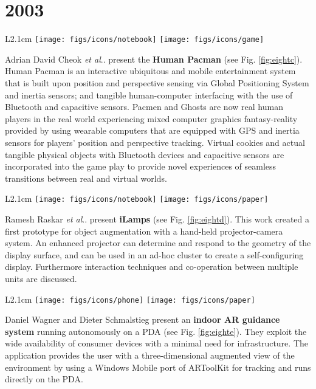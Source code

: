 \documentclass[12pt,a4paper]{article}
\makeatletter
\DeclareRobustCommand\onedot{\futurelet\@let@token\@onedot}
\def\@onedot{\ifx\@let@token.\else.\null\fi\xspace}
\def\etal{\emph{et al}\onedot}
\makeatother
\begin{document}
\vspace{-5pt}
\section*{2003}

\begin{wrapfigure}{L}{2.1cm}
	\vspace{-10pt}	
	\texttt{[image: figs/icons/notebook]}
	\texttt{[image: figs/icons/game]}	
	\vspace{-20pt}		
\end{wrapfigure}
Adrian David Cheok \etal present the \textbf{Human Pacman} \cite{Cheok03} (see Fig. \ref{fig:eightc}). Human Pacman is an interactive ubiquitous and mobile entertainment system that is built upon position and perspective sensing via Global Positioning System and inertia sensors; and tangible human-computer interfacing with the use of Bluetooth and capacitive sensors. Pacmen and Ghosts are now real human players in the real world experiencing mixed computer graphics fantasy-reality provided by using wearable computers that are equipped with GPS and inertia sensors for players' position and perspective tracking. Virtual cookies and actual tangible physical objects with Bluetooth devices and capacitive sensors are incorporated into the game play to provide novel experiences of seamless transitions between real and virtual worlds.

\vspace{0.1in}

\begin{wrapfigure}{L}{2.1cm}
	\vspace{-10pt}	
	\texttt{[image: figs/icons/notebook]}
	\texttt{[image: figs/icons/paper]}	
	\vspace{-20pt}		
\end{wrapfigure}
\noindent Ramesh Raskar \etal present \textbf{iLamps} \cite{Raskar03} (see Fig. \ref{fig:eightd}). This work created a first prototype for object augmentation with a hand-held projector-camera system. An enhanced projector can determine and respond to the geometry of the display surface, and can be used in an ad-hoc cluster to create a self-configuring display. Furthermore interaction techniques and co-operation between multiple units are discussed.

\vspace{0.1in}

\begin{wrapfigure}{L}{2.1cm}
	\vspace{-15pt}	
	\texttt{[image: figs/icons/phone]}
	\texttt{[image: figs/icons/paper]}	
	\vspace{-25pt}		
\end{wrapfigure}
\noindent Daniel Wagner and Dieter Schmalstieg present an \textbf{indoor AR guidance system} running autonomously on a PDA \cite{Wagner03} (see Fig. \ref{fig:eighte}). They exploit the wide availability of consumer devices with a minimal need for infrastructure. The application provides the user with a three-dimensional augmented view of the environment by using a Windows Mobile port of ARToolKit for tracking and runs directly on the PDA.
\end{document}
